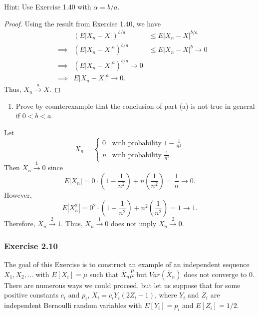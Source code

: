 \documentclass[12pt,]{article}
\providecommand{\tightlist}{%
  \setlength{\itemsep}{0pt}\setlength{\parskip}{0pt}}
\begin{document}
Hint: Use Exercise 1.40 with \(\alpha = b/a.\)

\begin{proof}
Using the result from Exercise 1.40, we have 
\begin{align*}
&&(E|X_n-X|)^{b/a}&\le E|X_n-X|^{b/a}\\
&\implies&(E|X_n-X|^a)^{b/a}&\le E|X_n-X|^{b}\rightarrow 0\\
&\implies&(E|X_n-X|^a)^{b/a}\rightarrow 0\\
&\implies&E|X_n-X|^a\rightarrow 0.
\end{align*}
Thus, $X_n \overset{a}\rightarrow X$.
\end{proof}

\begin{enumerate}
\def\labelenumi{(\alph{enumi})}
\setcounter{enumi}{1}
\tightlist
\item
  Prove by counterexample that the conclusion of part (a) is not true in
  general if \(0 < b < a.\)
\end{enumerate}

Let \[X_n = \begin{cases}
                                   0 & \text{with probability $1-\frac{1}{n^2}$} \\
                                   n & \text{with probability $\frac{1}{n^2}$}.
  \end{cases}\] Then \(X_n\overset{1}\rightarrow 0\) since
\[E|X_n|=0\cdot \left(1-\frac{1}{n^2}\right)+n\left(\frac{1}{n^2}\right)=\frac{1}{n}\rightarrow 0.\]
However,
\[E|X_n^2|=0^2\cdot \left(1-\frac{1}{n^2}\right)+n^2\left(\frac{1}{n^2}\right)=1\rightarrow 1.\]
Therefore, \(X_n\overset{2}\rightarrow 1\). Thus,
\(X_n\overset{1}\rightarrow 0\) does not imply
\(X_n\overset{2}\rightarrow 0.\)

\hypertarget{exercise-2.10}{%
\subsubsection{Exercise 2.10}\label{exercise-2.10}}

The goal of this Exercise is to construct an example of an independent
sequence \(X_1, X_2, ...\) with \(E[X_i] = \mu\) such that
\(\bar{X}_n\overset{P}\mu\) but \(Var(\bar{X}_n)\) does not converge to
0. There are numerous ways we could proceed, but let us suppose that for
some positive constants \(c_i\) and \(p_i\),
\(X_i = c_i Y_i(2Z_i - 1)\), where \(Y_i\) and \(Z_i\) are independent
Bernoulli random variables with \(E[Y_i] = p_i\) and \(E[Z_i] = 1/2.\)
\end{document}
